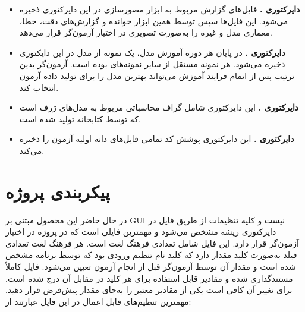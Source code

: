 \begin{itemize}
\item{
	\textbf{دایرکتوری .}
	فایل‌های گزارش مربوط به ابزار مصورسازی  در این دایرکتوری ذخیره می‌شود. این فایل‌ها سپس توسط همین ابزار خوانده و گزارش‌های دقت، خطا، معماری مدل و غیره را به‌صورت تصویری در اختیار آزمون‌گر قرار می‌دهد.
}

\item{
	\textbf{دایرکتوری .}
	در پایان هر دوره آموزش مدل، یک نمونه از مدل در این دایکتوری ذخیره می‌شود. هر نمونه مستقل از سایر نمونه‌های بوده است. آزمون‌گر بدین ترتیب پس از اتمام فرایند آموزش می‌تواند بهترین مدل را برای تولید داده آزمون انتخاب کند.
}

\item{
	\textbf{دایرکتوری .}
	این دایرکتوری شامل گراف محاسباتی مربوط به مدل‌های ژرف است که توسط کتابخانه  تولید شده است. 
}

\item{
	\textbf{دایرکتوری .}
	این دایرکتوری پوشش کد تمامی فایل‌های دانه اولیه آزمون را ذخیره می‌کند.
}

\end{itemize}


\section{پیکربندی پروژه}
در حال حاضر این محصول مبتنی بر \gls{GUI} نیست و کلیه تنظیمات از طریق فایل  در دایرکتوری ریشه مشخص می‌شود و مهمترین فایلی است که در پروژه در اختیار آزمون‌گر قرار دارد.
این فایل شامل تعدادی فرهنگ لغت است. هر فرهنگ لغت تعدادی فیلد به‌صورت کلید-مقدار دارد که کلید نام تنظیم ورودی بود که توسط برنامه مشخص شده است و مقدار آن توسط آزمون‌گر قبل از انجام آزمون تعیین می‌شود. فایل 
کاملاً مستندگذاری شده و مقادیر قابل استفاده برای هر کلید در مقابل آن درج شده است. برای تغییر آن کافی است یکی از مقادیر معتبر را به‌جای مقدار پیش‌فرض قرار دهید. مهمترین تنظیم‌های قابل اعمال در این فایل عبارتند از:


